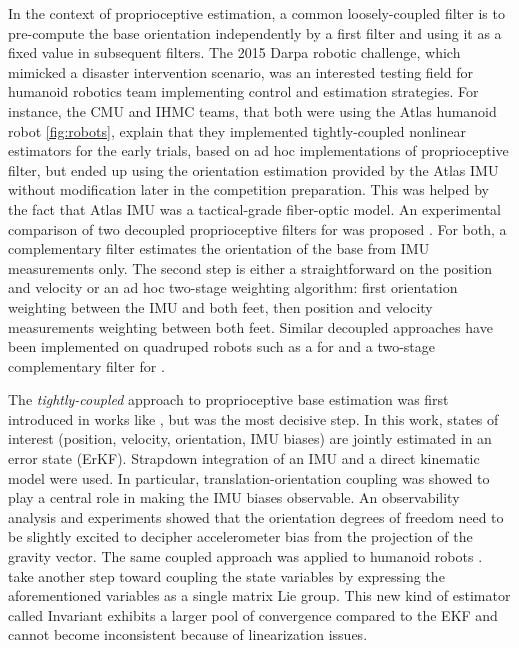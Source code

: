 In the context of proprioceptive estimation, a common loosely-coupled filter is to pre-compute the base orientation independently by a first filter and using it as a 
fixed value in subsequent filters. The 2015 Darpa robotic challenge, which mimicked a disaster intervention scenario, was an interested testing field for humanoid robotics
team implementing control and estimation strategies. For instance, the CMU \cite{feng2015optimization} and IHMC 
\cite{johnson2015team} teams, that both were using the Atlas humanoid robot \ref{fig:robots}, explain that they implemented tightly-coupled nonlinear estimators for the 
early trials, based on ad hoc implementations of proprioceptive filter, but ended up using the orientation estimation provided by the Atlas IMU without modification 
later in the competition preparation. This was helped by the fact that Atlas IMU was a tactical-grade fiber-optic model. 
An experimental comparison of two decoupled proprioceptive filters for  was proposed \cite{flayols2017experimental}. For both, a complementary filter estimates 
the orientation of the base from IMU measurements only. The second step is either a straightforward \KalmanF on the position and velocity or an ad hoc two-stage 
weighting algorithm: first orientation weighting between the IMU and both feet, then position and velocity measurements 
weighting between both feet. Similar decoupled approaches have been implemented on quadruped robots such as a \KalmanF for \cite{bledt2018cheetah} and a two-stage complementary filter for \cite{leziart2021implementation}.

The \textit{tightly-coupled} approach to proprioceptive base estimation was first introduced in works like \cite{chilian2011multisensor}, but \cite{bloesch2013state} was the most decisive step.
In this work, states of interest (position, velocity, orientation, IMU biases) are jointly estimated in an error state \KalmanF (ErKF). Strapdown integration of an IMU and 
a direct kinematic model were used. In particular, translation-orientation coupling was showed to play a central role in making the IMU biases observable. 
An observability analysis and experiments showed that the orientation degrees of freedom need to be slightly excited to decipher accelerometer bias from the projection of the 
gravity vector. The same coupled approach was applied to humanoid robots \cite{rotella2014state, fallon2014drift}.
\cite{hartley2020contact, lin2021deep} take another step toward coupling the state variables by expressing the aforementioned variables as a single matrix Lie group.
This new kind of estimator called Invariant \KalmanF \cite{barrau2018invariant} exhibits a larger pool of convergence compared to the EKF and cannot become 
inconsistent because of linearization issues. 

